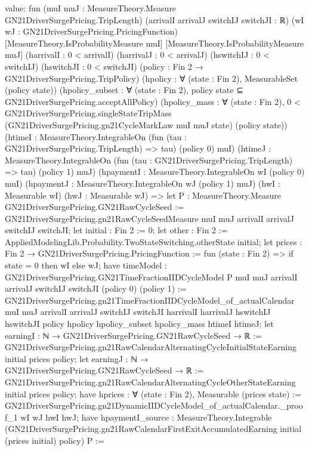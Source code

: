 \documentclass[10pt]{article}
\begin{document}
\begin{ReviewVerbatim}
value:
fun (muI muJ : MeasureTheory.Measure GN21DriverSurgePricing.TripLength) (arrivalI arrivalJ switchIJ switchJI : ℝ)
    (wI wJ : GN21DriverSurgePricing.PricingFunction) [MeasureTheory.IsProbabilityMeasure muI]
    [MeasureTheory.IsProbabilityMeasure muJ] (harrivalI : 0 < arrivalI) (harrivalJ : 0 < arrivalJ)
    (hswitchIJ : 0 < switchIJ) (hswitchJI : 0 < switchJI) (policy : Fin 2 → GN21DriverSurgePricing.TripPolicy)
    (hpolicy : ∀ (state : Fin 2), MeasurableSet (policy state))
    (hpolicy_subset : ∀ (state : Fin 2), policy state ⊆ GN21DriverSurgePricing.acceptAllPolicy)
    (hpolicy_mass :
      ∀ (state : Fin 2),
        0 <
          GN21DriverSurgePricing.singleStateTripMass (GN21DriverSurgePricing.gn21CycleMarkLaw muI muJ state)
            (policy state))
    (htimeI : MeasureTheory.IntegrableOn (fun (tau : GN21DriverSurgePricing.TripLength) => tau) (policy 0) muI)
    (htimeJ : MeasureTheory.IntegrableOn (fun (tau : GN21DriverSurgePricing.TripLength) => tau) (policy 1) muJ)
    (hpaymentI : MeasureTheory.IntegrableOn wI (policy 0) muI)
    (hpaymentJ : MeasureTheory.IntegrableOn wJ (policy 1) muJ) (hwI : Measurable wI) (hwJ : Measurable wJ) =>
  let P : MeasureTheory.Measure GN21DriverSurgePricing.GN21RawCycleSeed :=
    GN21DriverSurgePricing.gn21RawCycleSeedMeasure muI muJ arrivalI arrivalJ switchIJ switchJI;
  let initial : Fin 2 := 0;
  let other : Fin 2 := AppliedModelingLib.Probability.TwoStateSwitching.otherState initial;
  let prices : Fin 2 → GN21DriverSurgePricing.PricingFunction := fun (state : Fin 2) => if state = 0 then wI else wJ;
  have timeModel :
    GN21DriverSurgePricing.GN21TimeFractionIIDCycleModel P muI muJ arrivalI arrivalJ switchIJ switchJI (policy 0)
      (policy 1) :=
    GN21DriverSurgePricing.gn21TimeFractionIIDCycleModel_of_actualCalendar muI muJ arrivalI arrivalJ switchIJ switchJI
      harrivalI harrivalJ hswitchIJ hswitchJI policy hpolicy hpolicy_subset hpolicy_mass htimeI htimeJ;
  let earningI : ℕ → GN21DriverSurgePricing.GN21RawCycleSeed → ℝ :=
    GN21DriverSurgePricing.gn21RawCalendarAlternatingCycleInitialStateEarning initial prices policy;
  let earningJ : ℕ → GN21DriverSurgePricing.GN21RawCycleSeed → ℝ :=
    GN21DriverSurgePricing.gn21RawCalendarAlternatingCycleOtherStateEarning initial prices policy;
  have hprices : ∀ (state : Fin 2), Measurable (prices state) :=
    GN21DriverSurgePricing.gn21DynamicIIDCycleModel_of_actualCalendar._proof_1 wI wJ hwI hwJ;
  have hpaymentI_source :
    MeasureTheory.Integrable
      (GN21DriverSurgePricing.gn21RawCalendarFirstExitAccumulatedEarning initial (prices initial) policy) P :=

\end{ReviewVerbatim}
\end{document}
